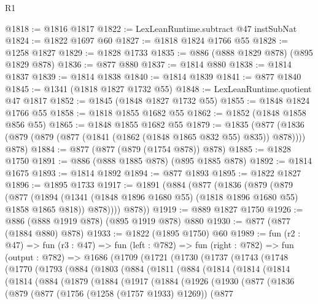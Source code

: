 \begin{lexlean}{R1}
\begin{coremodule}
@1818 := @1816 @1817
@1822 := LexLeanRuntime.subtract @47 instSubNat
@1824 := @1822 @1697 @60
@1827 := @1818 @1824 @1766 @55
@1828 := @1258 @1827
@1829 := @1828 @1733
@1835 := @886 (@888 @1829 @878) (@895 @1829 @878)
@1836 := @877 @880
@1837 := @1814 @880
@1838 := @1814 @1837
@1839 := @1814 @1838
@1840 := @1814 @1839
@1841 := @877 @1840
@1845 := @1341 (@1818 @1827 @1732 @55)
@1848 := LexLeanRuntime.quotient @47 @1817
@1852 := @1845 (@1848 @1827 @1732 @55)
@1855 := @1848 @1824 @1766 @55
@1858 := @1818 @1855 @1682 @55
@1862 := @1852 (@1848 @1858 @856 @55)
@1865 := @1848 @1855 @1682 @55
@1879 := @1835
    (@877 (@1836 (@879 (@879 (@877 (@1841 (@1862 (@1848 @1865 @832 @55) @835)) @878)))) @878)
@1884 := @877 (@877 (@879 (@1754 @878)) @878)
@1885 := @1828 @1750
@1891 := @886 (@888 @1885 @878) (@895 @1885 @878)
@1892 := @1814 @1675
@1893 := @1814 @1892
@1894 := @877 @1893
@1895 := @1822 @1827
@1896 := @1895 @1733
@1917 := @1891
    (@884
      (@877
        (@1836
          (@879
            (@879
              (@877
                (@1894 (@1341 (@1848 @1896 @1680 @55) (@1818 @1896 @1680 @55) @1858 @1865 @818))
                @878))))
        @878))
@1919 := @889 @1827 @1750
@1926 := @886 (@888 @1919 @878) (@895 @1919 @878) @880
@1930 := @877 (@877 (@1884 @880) @878)
@1933 := @1822 (@1895 @1750) @60
@1989 := fun (r2 : @47) =>
  fun (r3 : @47) =>
  fun (left : @782) =>
  fun (right : @782) =>
  fun (output : @782) =>
  @1686
    (@1709
      (@1721
        (@1730
          (@1737
            (@1743
              (@1748
                (@1770
                  (@1793
                    (@884
                      (@1803
                        (@884
                          (@1811
                            (@884
                              (@1814
                                (@1814
                                  (@1814
                                    (@1814
                                      (@884
                                        (@1879
                                          (@1884
                                            (@1917
                                              (@1884
                                                (@1926
                                                  (@1930
                                                    (@877
                                                      (@1836
                                                        (@879
                                                          (@877
                                                            (@1756 (@1258 (@1757 @1933) @1269))
                                                            (@877

\end{coremodule}
\end{lexlean}
